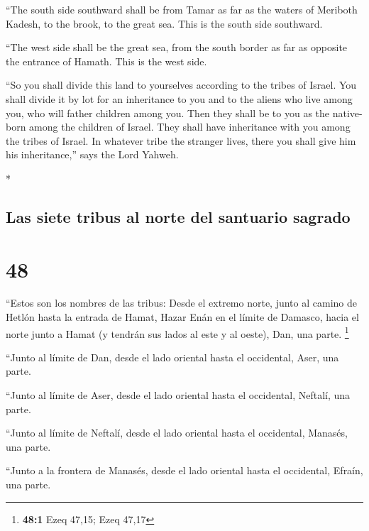 \begin{paracol}{2}
\begin{otherlanguage}{english}
 ``The south side southward shall be from Tamar as far as
the waters of Meriboth Kadesh, to the brook, to the great sea. This is
the south side southward.

 ``The west side shall be the great sea, from the south
border as far as opposite the entrance of Hamath. This is the west side.

 ``So you shall divide this land to yourselves according
to the tribes of Israel.  You shall divide it by lot for
an inheritance to you and to the aliens who live among you, who will
father children among you. Then they shall be to you as the native-born
among the children of Israel. They shall have inheritance with you among
the tribes of Israel.  In whatever tribe the stranger
lives, there you shall give him his inheritance,'' says the Lord Yahweh.

\end{otherlanguage}

\switchcolumn[0]*

\hypertarget{las-siete-tribus-al-norte-del-santuario-sagrado}{%
\subsection{Las siete tribus al norte del santuario
sagrado}\label{las-siete-tribus-al-norte-del-santuario-sagrado}}

\hypertarget{section-94}{%
\section{48}\label{section-94}}

 ``Estos son los nombres de las tribus: Desde el extremo
norte, junto al camino de Hetlón hasta la entrada de Hamat, Hazar Enán
en el límite de Damasco, hacia el norte junto a Hamat (y tendrán sus
lados al este y al oeste), Dan, una parte. \footnote{\textbf{48:1} Ezeq
  47,15; Ezeq 47,17}

 ``Junto al límite de Dan, desde el lado oriental hasta el
occidental, Aser, una parte.

 ``Junto al límite de Aser, desde el lado oriental hasta
el occidental, Neftalí, una parte.

 ``Junto al límite de Neftalí, desde el lado oriental
hasta el occidental, Manasés, una parte.

 ``Junto a la frontera de Manasés, desde el lado oriental
hasta el occidental, Efraín, una parte.


\end{paracol}
